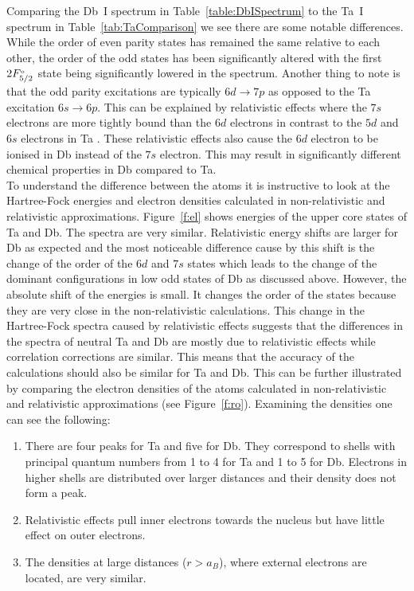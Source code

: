 \documentclass[10pt,a4paper, twoside, openright]{report}
\begin{document}
Comparing the Db~I spectrum in Table~\ref{table:DbISpectrum} to the Ta~I spectrum in Table~\ref{tab:TaComparison} we see there are some notable differences. While the order of even parity states has remained the same relative to each other,  the order of the odd states has been significantly altered with the first $2F^{\rm_o}_{5/2}$ state being significantly lowered in the spectrum. Another thing to note is that the odd parity excitations are typically $6d \rightarrow 7p$ as opposed to the Ta excitation $6s \rightarrow 6p$. This can be explained by relativistic effects where the $7s$ electrons are more tightly bound than the $6d$ electrons in contrast to the $5d$ and $6s$ electrons in Ta \cite{Schwerdtfeger2014}. These relativistic effects also cause the $6d$ electron to be ionised in Db instead of the $7s$ electron. This may result in significantly different chemical properties in Db compared to Ta. \\
\linebreak
To understand the difference between the atoms it is instructive to look at the Hartree-Fock energies and electron 
densities calculated in non-relativistic and relativistic approximations. Figure~\ref{f:el} shows energies of the upper
core states of Ta and Db. The spectra are very similar. Relativistic energy shifts are larger for Db as expected and
the most noticeable difference cause by this shift is the change of the order of the $6d$ and $7s$ states which leads 
to the  change of the dominant configurations in low odd states of Db as discussed above.  However, the absolute
shift of the energies is small. It changes the order of the states because they are very close in the non-relativistic
calculations. This change in the Hartree-Fock spectra caused by relativistic effects suggests that the differences 
in the spectra of neutral Ta and Db are mostly due to relativistic effects while correlation corrections are
similar. This means that the accuracy of the calculations should also be similar for Ta and Db.
This can be further illustrated by comparing the electron densities of the atoms calculated in non-relativistic and relativistic
approximations (see Figure~\ref{f:ro}). Examining the densities one can see the following:
\begin{enumerate}
\item There are four peaks for Ta and five for Db. They correspond to shells with principal quantum numbers from 1 to 4 for
Ta and 1 to 5 for Db. Electrons in higher shells are distributed over larger distances and their density does not form a peak.
\item   Relativistic effects pull inner electrons towards the nucleus but have little effect on outer electrons.
\item The densities at large distances ($r>a_B$), where external electrons are located, are very similar.
\end{enumerate}
\end{document}
